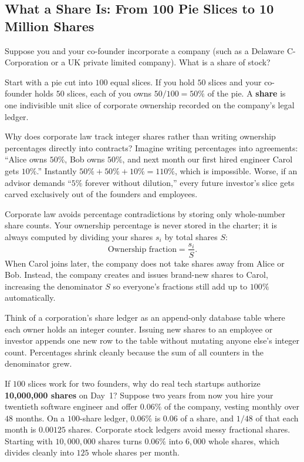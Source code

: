 \subsection{What a Share Is: From 100 Pie Slices to 10 Million Shares}

Suppose you and your co-founder incorporate a company (such as a Delaware C-Corporation or a UK private limited company). What is a share of stock?

Start with a pie cut into $100$ equal slices. If you hold $50$ slices and your co-founder holds $50$ slices, each of you owns $50 / 100 = 50\%$ of the pie. A \textbf{share} is one indivisible unit slice of corporate ownership recorded on the company's legal ledger.

Why does corporate law track integer shares rather than writing ownership percentages directly into contracts? Imagine writing percentages into agreements: ``Alice owns $50\%$, Bob owns $50\%$, and next month our first hired engineer Carol gets $10\%$.'' Instantly $50\% + 50\% + 10\% = 110\%$, which is impossible. Worse, if an advisor demands ``$5\%$ forever without dilution,'' every future investor's slice gets carved exclusively out of the founders and employees.

Corporate law avoids percentage contradictions by storing only whole-number share counts. Your ownership percentage is never stored in the charter; it is always computed by dividing your shares $s_i$ by total shares $S$:
\[
  \text{Ownership fraction} = \frac{s_i}{S}.
\]
When Carol joins later, the company does not take shares away from Alice or Bob. Instead, the company creates and issues brand-new shares to Carol, increasing the denominator $S$ so everyone's fractions still add up to $100\%$ automatically.

\begin{intuitionbox}
Think of a corporation's share ledger as an append-only database table where each owner holds an integer counter. Issuing new shares to an employee or investor appends one new row to the table without mutating anyone else's integer count. Percentages shrink cleanly because the sum of all counters in the denominator grew.
\end{intuitionbox}

If $100$ slices work for two founders, why do real tech startups authorize \textbf{10,000,000 shares} on Day~1? Suppose two years from now you hire your twentieth software engineer and offer $0.06\%$ of the company, vesting monthly over $48$ months. On a $100$-share ledger, $0.06\%$ is $0.06$ of a share, and $1/48$ of that each month is $0.00125$ shares. Corporate stock ledgers avoid messy fractional shares. Starting with $10{,}000{,}000$ shares turns $0.06\%$ into $6{,}000$ whole shares, which divides cleanly into $125$ whole shares per month.

